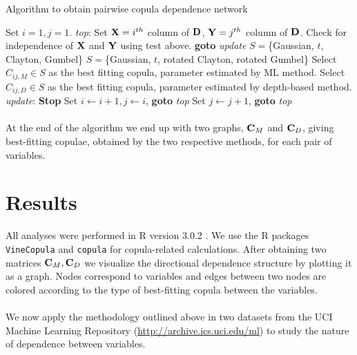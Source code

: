 \documentclass[11pt]{llncs}
\begin{document}
\begin{algorithm}
\caption{Algorithm to obtain pairwise copula dependence network}
\begin{algorithmic}[1]
\State Set $i=1,j=1$.
\State \emph{top}:
\State Set ${\mathbf{X}}=i^{th}$ column of ${\mathbf{D}}$, ${\mathbf{Y}}=j^{th}$ column of ${\mathbf{D}}$.
\State Check for independence of ${\mathbf{X}}$ and ${\mathbf{Y}}$ using test above.
	\State \textbf{goto} \emph{update}
\Else
		\State $S=$\{Gaussian, $t$, Clayton, Gumbel\}
	\Else
		\State $S=$\{Gaussian, $t$, rotated Clayton, rotated Gumbel\}
	\EndIf
	\State Select $C_{ij,M}\in S$ as the best fitting copula, parameter estimated by ML method.
	\State Select $C_{ij,D}\in S$ as the best fitting copula, parameter estimated by depth-based method.
\EndIf
\State \emph{update}:
	 \textbf{Stop}
	\Else \State Set $i\leftarrow i+1, j\leftarrow i$, \textbf{goto} \emph{top}
	\EndIf
\Else \State Set $j\leftarrow j+1$, \textbf{goto} \emph{top}
\EndIf

\EndProcedure
\end{algorithmic}
\end{algorithm}
\vspace{2cm}
\paragraph{}At the end of the algorithm we end up with two graphs, ${\mathbf{C}}_M$ and ${\mathbf{C}}_D$, giving best-fitting copulae, obtained by the two respective methods, for each pair of variables.

\section{Results}All analyses were performed in R version 3.0.2 \cite{R302}. We use the R packages \texttt{VineCopula} and \texttt{copula} for copula-related calculations. After obtaining two matrices ${\mathbf{C}}_M,{\mathbf{C}}_D$ we visualize the directional dependence structure by plotting it as a graph. Nodes correspond to  variables and edges between two nodes are colored according to the type of best-fitting copula between the variables.

\paragraph{}We now apply the methodology outlined above in two datasets from the UCI Machine Learning Repository (\url{http://archive.ics.uci.edu/ml}) to study the nature of dependence between variables.
\end{document}
